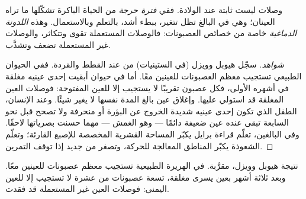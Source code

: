 \begin{proposition}[اللدونة]\label{prop:g11:vision-and-brain:plasticity}
وصلات  ليست ثابتة عند الولادة. ففي \emph{فترة حرجة} من
الحياة الباكرة تشكّلها ما تراه العينان؛ وهي في البالغ تظل تتغير، ببطء
أشد، بالتعلم وبالاستعمال. وهذه \emph{اللدونة
الدماغية} خاصة من خصائص العصبونات: فالوصلات
المستعملة تقوى وتتكاثر، والوصلات غير المستعملة تضعف وتشذَّب.
\end{proposition}
\begin{proof}[شواهد]
سجّل هيوبل وويزل (في الستينيات) من  عند القطط والقردة.
ففي الحيوان الطبيعي تستجيب معظم العصبونات للعينين معًا. أما في حيوان
أبقيت إحدى عينيه مغلقة في أشهره الأولى، فكل عصبون تقريبًا لا يستجيب
إلا للعين المفتوحة: فوصلات العين المغلقة قد استولي عليها. وإغلاق عين
بالغ المدة نفسها لا يغير شيئًا. وعند الإنسان، الطفل الذي تكون إحدى
عينيه شديدة الخروج عن البؤرة أو منحرفة ولا تصحح قبل نحو السابعة تبقى
عنده عين ضعيفة دائمًا --- وهو الغمش --- مهما حسنت بصرياتها لاحقًا. وفي
البالغين، تعلّم قراءة برايل يكبّر المساحة القشرية المخصصة للإصبع
القارئة؛ وتعلّم الشعوذة يكبّر المناطق المعالجة للحركة، وتصغر من جديد
إذا توقف التمرين.
\end{proof}

\begin{omfigure}

{\small نتيجة هيوبل وويزل، مقرَّبة. في الهريرة الطبيعية تستجيب معظم
عصبونات  للعينين معًا. وبعد ثلاثة أشهر بعين يسرى مغلقة،
تسعة عصبونات من عشرة لا تستجيب إلا للعين اليمنى: فوصلات العين غير
المستعملة قد فقدت.}
\end{omfigure}

